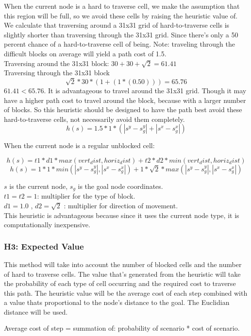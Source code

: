 When the current node is a hard to traverse cell, we make the assumption that this region will be full, so we avoid these cells by raising the heuristic value of.
We calculate that traversing around a 31x31 grid of hard-to-traverse cells is slightly shorter than traversing through the 31x31 grid. Since there's only a 50 percent chance of a hard-to-traverse cell of being. Note: traveling through the difficult blocks on average will yield a path cost of 1.5.
\\Traversing around the 31x31 block: $ 30 + 30 + \sqrt{2} = 61.41$
\\Traversing through the 31x31 block \[ \sqrt{2} * 30 * (1 + (1 * (0.50))) = 65.76\] 
$61.41 < 65.76$. It is advantageous to travel around the 31x31 grid.
Though it may have a higher path cost to travel around the block, because with a larger number of blocks.
So this heuristic should be designed to have the path best avoid these hard-to-traverse cells, not necessarily avoid them completely.
\[h(s) = 1.5 * 1 * ( |s^y - s_g^y| + |s^x - s_g^x| )\]

When the current node is a regular unblocked cell:

\[h(s) = t1 * d1  * max(vert_dist, horiz_dist) + t2 * d2 * min(vert_dist, horiz_dist)\]
\[h(s) = 1 * 1 *min(|s^y - s_g^y|, |s^x - s_g^x|) + 1 * \sqrt{2} * max(|s^y - s_g^y|, |s^x - s_g^x|)   \]

 $s$ is the current node, $s_g$ is the goal node coordinates. \\
 $t1 = t2 = 1$: multiplier for the type of block. \\
 $d1 = 1.0$ , $d2 = \sqrt{2}$ : multiplier for direction of movement. \\

This heuristic is advantageous because since it uses the current node type, it is computationally inexpensive. 

\subsubsection{H3: Expected Value}
This method will take into account the number of blocked cells and the number of hard to traverse cells. The value that's generated from the heuristic will take the probability of each type of cell occurring and the required cost to traverse this path. The heuristic value will be the average cost of each step combined with a value thats proportional to the node's distance to the goal. The Euclidian distance will be used.

Average cost of step = summation of: probability of scenario * cost of scenario.

